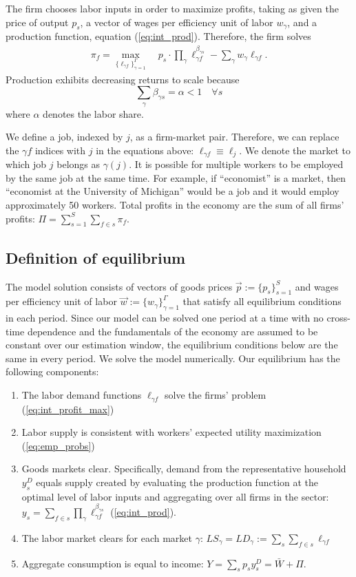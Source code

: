 \documentclass[12pt]{article}
\def\g{\gamma}
\theoremstyle{definition}
\theoremstyle{plain}
\begin{document}
The firm chooses labor inputs in order to maximize profits, taking as given the price of output $p_s$, a vector of wages per efficiency unit of labor $w_{\g}$, and a production function, equation (\ref{eq:int_prod}). Therefore, the firm solves
\begin{align}
	\pi_f = \max_{ \{ \ell_{\g f} \}_{\g=1}^{\Gamma} } \quad  p_s \cdot   \prod_{\g} \ell_{\g f}^{\beta_{\g s}}  - \sum_{\g} w_{\g} \ell_{\g f} . \label{eq:int_profit_max}
\end{align}
Production exhibits decreasing returns to scale because
\[ \sum_{\g} \beta_{\g s} =\alpha < 1 \quad \forall s \]
where $\alpha$ denotes the labor share. 

We define a job, indexed by $j$, as a firm-market pair. Therefore, we can replace the $\g f$ indices with $j$ in the equations above: $\ell_{\g f} \equiv \ell_j$. We denote the market to which job $j$ belongs as $\g(j)$. It is possible for multiple workers to be employed by the same job at the same time. For example, if ``economist'' is a market, then ``economist at the University of Michigan'' would be a job and it would employ approximately 50 workers. Total profits in the economy are the sum of all firms' profits: $\Pi = \sum_{s=1}^S \sum_{f \in s} \pi_f$.



\subsection{Definition of equilibrium}


The model solution consists of vectors of goods prices $\vec{p} := \{p_{s}\}_{s=1}^S$ and wages per efficiency unit of labor $\vec{w} := \{w_{\g}\}_{\g=1}^\Gamma$ that satisfy all equilibrium conditions in each period. Since our model can be solved one period at a time with no cross-time dependence and the fundamentals of the economy are assumed to be constant over our estimation window, the equilibrium conditions below are the same in every period. We solve the model numerically. Our equilibrium has the following components:
\begin{enumerate} 
	\item The labor demand functions $\ell_{\g f}$ solve the firms' problem (\ref{eq:int_profit_max})
	\item Labor supply is consistent with workers' expected utility maximization (\ref{eq:emp_probs})
	\item Goods markets clear. Specifically, demand from the representative household $y_s^D$ equals supply created by evaluating the production function at the optimal level of labor inputs and aggregating over all firms in the sector: $y_s = \sum_{f \in s} \prod_{\g} \ell_{\g f}^{\beta_{\g s}} $ (\ref{eq:int_prod}).
	\item The labor market clears for each market $\g$: $LS_\g = LD_\g := \sum_s \sum_{f \in s} \ell_{\g f}$
	\item Aggregate consumption is equal to income: $Y = \sum_{s} p_s y_s^D = \bar W + \Pi$.
\end{enumerate}
\end{document}
